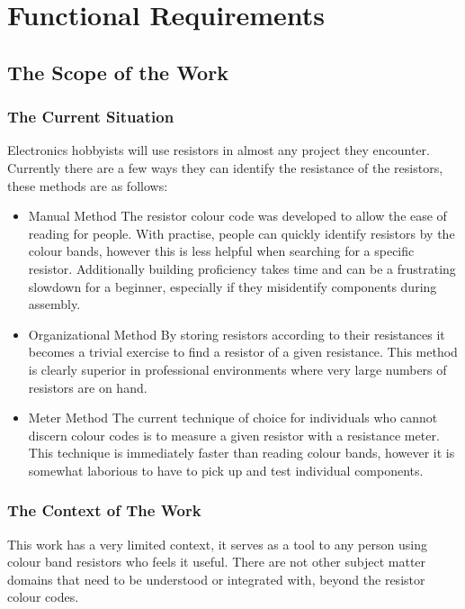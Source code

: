 \documentclass{article}
\begin{document}
\section{Functional Requirements}

\subsection{The Scope of the Work}

\subsubsection{The Current Situation}

Electronics hobbyists will use resistors in almost any project they encounter.
Currently there are a few ways they can identify the resistance of the resistors, these methods are as follows:
\begin{itemize}

\item Manual Method
\subitem The resistor colour code was developed to allow the ease of reading for people. 
With practise, people can quickly identify resistors by the colour bands, however this is less helpful when searching  for a specific resistor.
Additionally building proficiency takes time and can be a frustrating slowdown for a beginner, especially if they misidentify components during assembly.

\item Organizational Method
\subitem By storing resistors according to their resistances it becomes a trivial exercise to find a resistor of a given resistance.
This method is clearly superior in professional environments where very large numbers of resistors are on hand.

\item Meter Method
\subitem The current technique of choice for individuals who cannot discern colour codes is to measure a given resistor with a resistance meter.
This technique is immediately faster than reading colour bands, however it is somewhat laborious to have to pick up and test individual components.

\end{itemize}

\subsubsection{The Context of The Work}

This work has a very limited context, it serves as a tool to any person using colour band resistors who feels it useful.
There are not other subject matter domains that need to be understood or integrated with, beyond the resistor colour codes.
\end{document}
